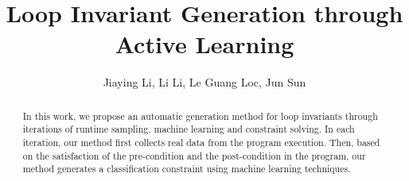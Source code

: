 \documentclass{llncs}
\begin{document}
\title{Loop Invariant Generation through Active Learning}
\author{
Jiaying Li, Li Li, Le Guang Loc, Jun Sun\\
}

\maketitle

\begin{abstract}
    In this work, we propose an automatic generation method for loop invariants 
    through iterations of runtime sampling, machine learning and constraint solving. 
    In each iteration, our method first collects real data from the program execution. 
    Then, based on the satisfaction of the pre-condition and the post-condition in the program, 
    our method generates a classification constraint 
    using machine learning techniques. 
    
\end{abstract}












\end{document}
